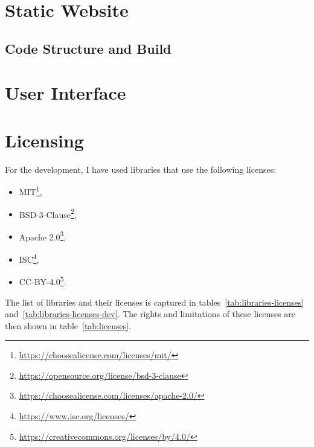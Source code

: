 \section{Static Website}

\subsection{Code Structure and Build}


\section{User Interface}


\section{Licensing}
For the development, I have used libraries that use the following licenses:
\begin{itemize}
    \item MIT\footnote{\url{https://choosealicense.com/licenses/mit/}},
    \item BSD-3-Clause\footnote{\url{https://opensource.org/license/bsd-3-clause}},
    \item Apache 2.0\footnote{\url{https://choosealicense.com/licenses/apache-2.0/}},
    \item ISC\footnote{\url{https://www.isc.org/licenses/}},
    \item CC-BY-4.0\footnote{\url{https://creativecommons.org/licenses/by/4.0/}}.
\end{itemize}

The list of libraries and their licenses is captured in tables~\ref{tab:libraries-licenses} and~\ref{tab:libraries-licenses-dev}.
The rights and limitations of these licenses are then shown in table~\ref{tab:licenses}.


